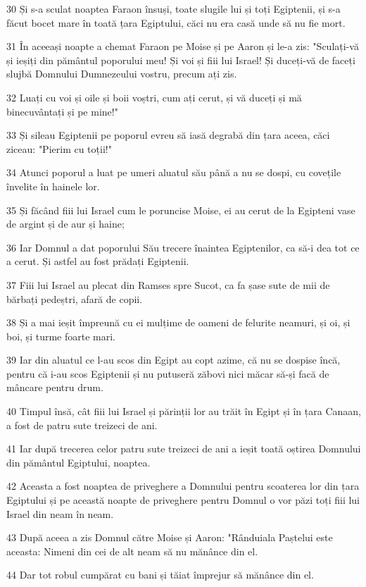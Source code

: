 \par 30 Și s-a sculat noaptea Faraon însuși, toate slugile lui și toți Egiptenii, și s-a făcut bocet mare în toată țara Egiptului, căci nu era casă unde să nu fie mort.
\par 31 În aceeași noapte a chemat Faraon pe Moise și pe Aaron și le-a zis: "Sculați-vă și ieșiți din pământul poporului meu! Și voi și fiii lui Israel! Și duceți-vă de faceți slujbă Domnului Dumnezeului vostru, precum ați zis.
\par 32 Luați cu voi și oile și boii voștri, cum ați cerut, și vă duceți și mă binecuvântați și pe mine!"
\par 33 Și sileau Egiptenii pe poporul evreu să iasă degrabă din țara aceea, căci ziceau: "Pierim cu toții!"
\par 34 Atunci poporul a luat pe umeri aluatul său până a nu se dospi, cu covețile învelite în hainele lor.
\par 35 Și făcând fiii lui Israel cum le poruncise Moise, ei au cerut de la Egipteni vase de argint și de aur și haine;
\par 36 Iar Domnul a dat poporului Său trecere înaintea Egiptenilor, ca să-i dea tot ce a cerut. Și astfel au fost prădați Egiptenii.
\par 37 Fiii lui Israel au plecat din Ramses spre Sucot, ca fa șase sute de mii de bărbați pedeștri, afară de copii.
\par 38 Și a mai ieșit împreună cu ei mulțime de oameni de felurite neamuri, și oi, și boi, și turme foarte mari.
\par 39 Iar din aluatul ce l-au scos din Egipt au copt azime, că nu se dospise încă, pentru că i-au scos Egiptenii și nu putuseră zăbovi nici măcar să-și facă de mâncare pentru drum.
\par 40 Timpul însă, cât fiii lui Israel și părinții lor au trăit în Egipt și în țara Canaan, a fost de patru sute treizeci de ani.
\par 41 Iar după trecerea celor patru sute treizeci de ani a ieșit toată oștirea Domnului din pământul Egiptului, noaptea.
\par 42 Aceasta a fost noaptea de priveghere a Domnului pentru scoaterea lor din țara Egiptului și pe această noapte de priveghere pentru Domnul o vor păzi toți fiii lui Israel din neam în neam.
\par 43 După aceea a zis Domnul către Moise și Aaron: "Rânduiala Paștelui este aceasta: Nimeni din cei de alt neam să nu mănânce din el.
\par 44 Dar tot robul cumpărat cu bani și tăiat împrejur să mănânce din el.

